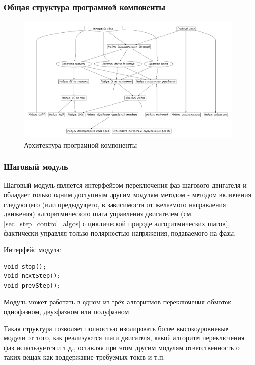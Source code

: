 \subsubsection{Общая структура програмной компоненты}

\begin{figure}[ht!]
    \centering
    \includegraphics[width=1.2\linewidth, angle=90, keepaspectratio]
                    {src/pictures/soft_arch.pdf}
    \caption{Архитектура програмной компоненты}
    \label{control_object_general_view}
\end{figure}

\subsubsection{Шаговый модуль}
Шаговый модуль является интерфейсом переключения фаз шагового двигателя и
обладает только одним доступным другим модулям методом - методом включения
следующего (или предыдущего, в зависимости от желаемого направления движения)
алгоритмического шага управления двигателем (см. \ref{sec_step_control_algos}
о циклической природе алгоритмических шагов), фактически управляя только
полярностью напряжения, подаваемого на фазы.

Интерфейс модуля:
\begin{lstlisting}
void stop();
void nextStep();
void prevStep();
\end{lstlisting}

Модуль может работать в одном из трёх
алгоритмов переключения обмоток~--- однофазном, двухфазном или полуфазном.

Такая структура позволяет полностью изолировать более высокоуровневые модули от
того, как реализуются шаги двигателя, какой алгоритм переключения фаз
используется и т.д., оставляя при этом другим модулям ответственность о таких вещах
как поддержание требуемых токов и т.п.

